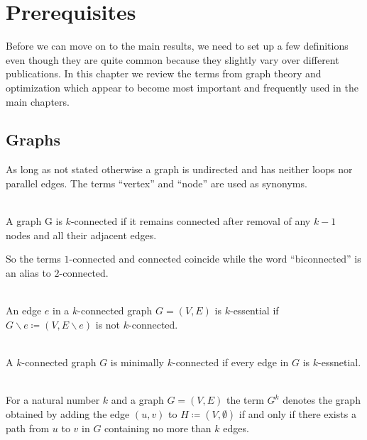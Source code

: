 \chapter{Prerequisites}
Before we can move on to the main results, we need to set up a few definitions even though they are quite common because they slightly vary over different publications. In this chapter we review the terms from graph theory and optimization which appear to become most important and frequently used in the main chapters.

\section{Graphs}
As long as not stated otherwise a graph is undirected and has neither loops nor parallel edges. The terms \enquote{vertex} and \enquote{node} are used as synonyms.

\begin{definition} [\(k\)-connected]\label{def:k_connected}\ \\
  A graph G is \(k\)-connected if it remains connected after removal of any \(k-1\) nodes and all their adjacent edges.
\end{definition}

So the terms \(1\)-connected and connected coincide while the word \enquote{biconnected} is an alias to \(2\)-connected.

\begin{definition} [\(k\)-essential]\label{def:k_essential}\ \\
  An edge \(e\) in a \(k\)-connected graph \(G = (V, E)\) is \(k\)-essential if \(G \backslash e \coloneqq (V, E \backslash e)\) is not \(k\)-connected.
\end{definition}

\begin{definition}\label{def:min_k_connected}\ \\
  A \(k\)-connected graph \(G\) is minimally \(k\)-connected if every edge in \(G\) is \(k\)-essnetial.
\end{definition}

\begin{definition}\label{def:power_of_graph}\ \\
  For a natural number \(k\) and a graph \(G = (V, E)\) the term \(G^{k}\) denotes the graph obtained by adding the edge \((u,v)\) to \(H \coloneqq (V, \emptyset)\) if and only if there exists a path from \(u\) to \(v\) in \(G\) containing no more than \(k\) edges.
\end{definition}

